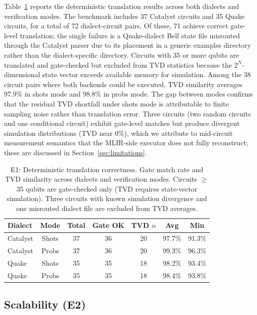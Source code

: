 \documentclass[conference]{IEEEtran}
\begin{document}
Table~\ref{tab:e1} reports the deterministic translation results across both dialects and verification modes. The benchmark includes 37 Catalyst circuits and 35 Quake circuits, for a total of 72 dialect-circuit pairs. Of these, 71 achieve correct gate-level translation; the single failure is a Quake-dialect Bell state file misrouted through the Catalyst parser due to its placement in a generic examples directory rather than the dialect-specific directory. Circuits with 35 or more qubits are translated and gate-checked but excluded from TVD statistics because the $2^N$-dimensional state vector exceeds available memory for simulation. Among the 38 circuit pairs where both backends could be executed, TVD similarity averages 97.9\% in shots mode and 98.8\% in probs mode. The gap between modes confirms that the residual TVD shortfall under shots mode is attributable to finite sampling noise rather than translation error. Three circuits (two random circuits and one conditional circuit) exhibit gate-level matches but produce divergent simulation distributions (TVD near 0\%), which we attribute to mid-circuit measurement semantics that the MLIR-side executor does not fully reconstruct; these are discussed in Section~\ref{sec:limitations}.

\begin{table}[htbp]
\centering
\caption{E1: Deterministic translation correctness. Gate match rate and TVD similarity across dialects and verification modes. Circuits $\geq$35 qubits are gate-checked only (TVD requires state-vector simulation). Three circuits with known simulation divergence and one misrouted dialect file are excluded from TVD averages.}
\label{tab:e1}
\renewcommand{\arraystretch}{1.1}
\begin{tabular}{@{}lcccccc@{}}
\toprule
\textbf{Dialect} & \textbf{Mode} & \textbf{Total} & \textbf{Gate OK} & \textbf{TVD $n$} & \textbf{Avg} & \textbf{Min} \\
\midrule
Catalyst & Shots & 37 & 36 & 20 & 97.7\% & 91.3\% \\
Catalyst & Probs & 37 & 36 & 20 & 99.3\% & 96.3\% \\
Quake    & Shots & 35 & 35 & 18 & 98.2\% & 93.4\% \\
Quake    & Probs & 35 & 35 & 18 & 98.4\% & 93.8\% \\
\bottomrule
\end{tabular}
\end{table}

\subsection{Scalability (E2)}
\end{document}
